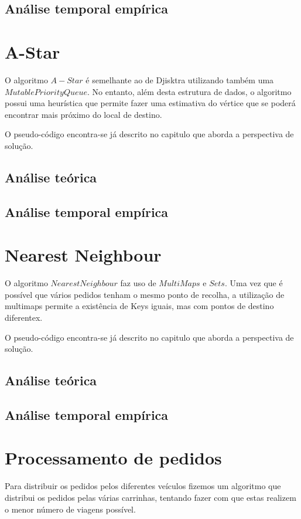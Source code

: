 \documentclass[article, a4paper, 12pt, oneside]{memoir}
\begin{document}
\subsection{Análise temporal empírica}

\section{A-Star}
O algoritmo $A-Star$ é semelhante ao de Djisktra utilizando também uma $MutablePriorityQueue$.
No entanto, além desta estrutura de dados, o algoritmo possui uma heurística que 
permite fazer uma estimativa do vértice que se poderá encontrar mais próximo do local de destino.

O pseudo-código encontra-se já descrito no capitulo que aborda a perspectiva de solução.
\subsection{Análise teórica}
\subsection{Análise temporal empírica}

\section{Nearest Neighbour}
O algoritmo $Nearest Neighbour$ faz uso de $MultiMaps$ e $Sets$. Uma vez que é possível que vários pedidos tenham o mesmo ponto de recolha, a utilização de multimaps permite a
existência de Keys iguais, mas com pontos de destino diferentex.

O pseudo-código encontra-se já descrito no capitulo que aborda a perspectiva de solução.

\subsection{Análise teórica}
\subsection{Análise temporal empírica}

\section{Processamento de pedidos}
Para distribuir os pedidos pelos diferentes veículos fizemos um algoritmo que distribui os pedidos pelas várias carrinhas,
tentando fazer com que estas realizem o menor número de viagens possível.
\end{document}
